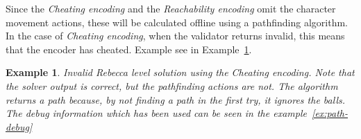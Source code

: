 \documentclass{report}
\theoremstyle{plain}
\newtheorem{example}{Example}[section]
\begin{document}
Since the \emph{Cheating encoding} and the \emph{Reachability encoding} omit the character movement actions, these will be calculated offline using a pathfinding algorithm. In the case of \emph{Cheating encoding}, when the validator returns invalid, this means that the encoder has cheated. Example see in Example~\ref{ex:rebecca-cheating}.

\vspace{1\baselineskip}

\newpage

\begin{example}
\label{ex:rebecca-cheating}
Invalid Rebecca level solution using the Cheating encoding. Note that the solver output is correct, but the pathfinding actions are not. The algorithm returns a path because, by not finding a path in the first try, it ignores the balls. The debug information which has been used can be seen in the example~\ref{ex:path-debug}

\vspace{1\baselineskip}


\end{example}
\end{document}
